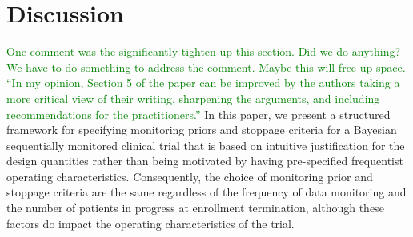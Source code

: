 \documentclass[12pt]{article}
\begin{document}
\section{Discussion}\label{sec:discussion}
\textcolor{green}{
One comment was the significantly tighten up this section. Did we do anything? We have to do something to address the comment. Maybe this will free up space. ``In my opinion, Section 5 of the paper can be improved by the authors taking a more critical view of their writing, sharpening the arguments, and including recommendations for the practitioners.''
}
In this paper, we present a structured framework for specifying monitoring priors and stoppage criteria for a Bayesian sequentially monitored clinical trial that is based on intuitive justification for the design quantities rather than being motivated by having pre-specified frequentist operating characteristics.
%
%
%
%
%
Consequently, the choice of monitoring prior and stoppage criteria are the same regardless of the frequency of data monitoring and the number of patients in progress at enrollment termination, although these factors do impact the operating characteristics of the trial.
%
\end{document}
